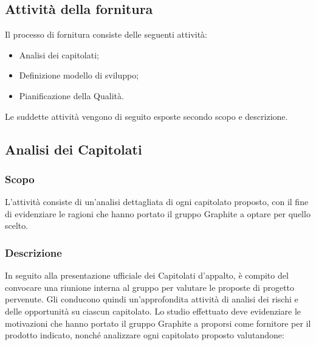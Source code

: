 \documentclass[../NormediProgetto.tex]{subfiles}
\begin{document}

\subsection{Attività della fornitura}

Il processo di fornitura consiste delle seguenti attività:

\begin{itemize}
	\item Analisi dei capitolati;
	
	\item Definizione modello di sviluppo; 
	
	\item Pianificazione della Qualità.
\end{itemize}

\noindent Le suddette attività vengono di seguito esposte secondo scopo e descrizione.


\subsection{Analisi dei Capitolati}
\subsubsection{Scopo}

L'attività consiste di un'analisi dettagliata di ogni capitolato proposto, con il fine di evidenziare le ragioni che hanno portato il gruppo Graphite a optare per quello scelto.

\subsubsection{Descrizione} 
In seguito alla presentazione ufficiale dei Capitolati d'appalto, è compito del  convocare una riunione interna al gruppo per valutare le proposte di progetto pervenute. Gli  conducono quindi un'approfondita attività di analisi dei rischi e delle opportunità su ciascun capitolato.
Lo studio effettuato deve evidenziare le motivazioni che hanno portato il gruppo Graphite a proporsi come fornitore per il prodotto indicato, nonché analizzare ogni capitolato proposto valutandone:
 
\end{document}
